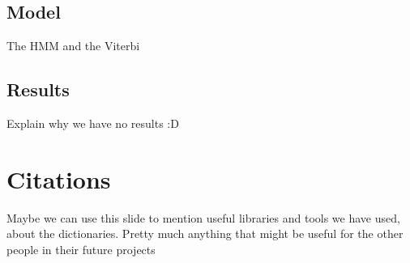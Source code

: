 \documentclass[
paper=128mm:96mm, %
fontsize=11pt, %
pagesize, %
parskip=half-, %
]{scrartcl} %
\newcommand*{\mygreen}[1]{\textcolor{mygreen}{#1}}
\theoremstyle{mythmstyle} %
\newtheorem{theorem}{Theorem}[section] %
\newtheorem{remark}[theorem]{Remark} %
\newtheorem{algorithm}[theorem]{Algorithm} %
\newcommand*{\mybox}[2]{ %
\par\noindent
\begin{tikzpicture}[mynodestyle/.style={rectangle,draw=mygreen,thick,inner sep=2mm,text justified,top color=white,bottom color=white,above}]\node[mynodestyle,at={(0.5*#1+2mm+0.4pt,0)}]{ %
\begin{minipage}[t]{#1}
#2
\end{minipage}
};
\end{tikzpicture}
\par\vspace{-1.3em}}
\begin{document}
\begin{comment}
The most common definition of \mygreen{Murphy's Law} is as follows.

\mybox{0.8\textwidth}{ %
\begin{theorem}[Murphy (1949)]
Anything that can go wrong, will go wrong.
\end{theorem}
}

\begin{proof}
A special case of this theorem is proven in the textbook.
\end{proof}

\begin{remark}
This is a remark.
\end{remark}

\begin{algorithm}
This is an algorithm.
\end{algorithm}
\end{comment}


\clearpage


\subsection*{Model}


The HMM and the Viterbi



\clearpage


\subsection*{Results}


Explain why we have no results :D


\clearpage


\section*{Citations}

Maybe we can use this slide to mention useful libraries and tools we have used, about the dictionaries. Pretty much anything that might be useful for the other people in their future projects
\end{document}

